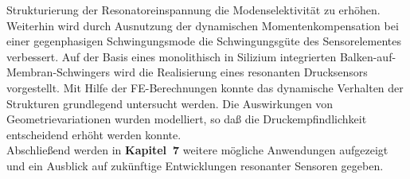 Strukturierung der Resonatoreinspannung die Modenselektivität zu erhöhen.
Weiterhin wird durch Ausnutzung der dynamischen Momentenkompensation bei
einer gegenphasigen Schwingungsmode die Schwingungsgüte des Sensorelementes
verbessert.
Auf der Basis eines monolithisch in Silizium integrierten
\glqq Balken-auf-Membran\grqq-Schwingers wird die Realisierung eines
resonanten Drucksensors vorgestellt. Mit Hilfe der FE-Berechnungen konnte
das dynamische Verhalten der Strukturen grundlegend untersucht werden. Die
Auswirkungen von Geometrievariationen wurden modelliert, so daß die
Druckempfindlichkeit entscheidend erhöht werden konnte.\\
%
Abschließend werden in {\bf Kapitel~7} weitere mögliche Anwendungen
aufgezeigt und ein Ausblick auf zukünftige Entwicklungen resonanter
Sensoren gegeben.

